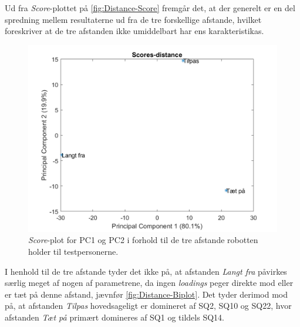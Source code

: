 \noindent
%
Ud fra \textit{Score}-plottet på \autoref{fig:Distance-Score} fremgår det, at der generelt er en del spredning mellem resultaterne ud fra de tre forskellige afstande, hvilket foreskriver at de tre afstanden ikke umiddelbart har ens karakteristikas.
%
\begin{figure}[H]
\centering
\includegraphics[width=\textwidth]{Figure/DatabehandlingSkalaer/PCAfigures/Distance-Scores}
\caption{\textit{Score}-plot for PC1 og PC2 i forhold til de tre afstande robotten holder til testpersonerne.}
\label{fig:Distance-Score}
\end{figure}
\noindent
%
I henhold til de tre afstande tyder det ikke på, at afstanden \textit{Langt fra} påvirkes særlig meget af nogen af parametrene, da ingen \textit{loadings} peger direkte mod eller er tæt på denne afstand, jævnfør \autoref{fig:Distance-Biplot}. Det tyder derimod mod på, at afstanden \textit{Tilpas} hovedsageligt er domineret af SQ2, SQ10 og SQ22, hvor afstanden \textit{Tæt på} primært domineres af SQ1 og tildels SQ14.     

